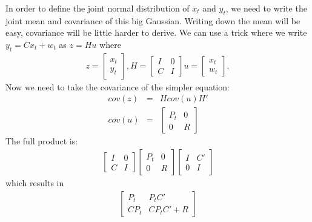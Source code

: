 In order to define the joint normal distribution of $x_{t}$ and $y_{t}$, we need
to write the joint mean and covariance of this big Gaussian. Writing down the
mean will be easy, covariance will be little harder to derive. We can use a
trick \cite{lall} where we write $y_{t} = Cx_{t} + w_t$ as $z = Hu$
where
\begin{eqnarray*}
z =   \left[ \begin{array}{c}
      x_{t} \\
      y_{t}
      \end{array} \right],
H =   \left[ \begin{array}{cc}
      I & 0 \\
      C & I
      \end{array} \right]
u =   \left[ \begin{array}{c}
      x_{t} \\
      w_t
      \end{array} \right],      
\end{eqnarray*}
Now we need to take the covariance of the simpler equation:
\begin{eqnarray*}
cov(z) &=& H cov(u) H'\\
cov(u) &=& \left[ \begin{array}{cc}
      P_{t} & 0 \\
      0 & R
      \end{array} \right]     
\end{eqnarray*}
The full product is:
\begin{eqnarray*}
\left[ \begin{array}{cc}
      I & 0 \\
      C & I
      \end{array} \right]
\left[ \begin{array}{cc}
      P_{t} & 0 \\
      0 & R
      \end{array} \right]
\left[ \begin{array}{cc}
      I & C' \\
      0 & I
      \end{array} \right]           
\end{eqnarray*}
which results in
\begin{eqnarray*}
\left[ \begin{array}{cc}
      P_{t} & P_{t}C' \\
      CP_{t} & CP_{t}C'+R
      \end{array} \right]           
\end{eqnarray*}
